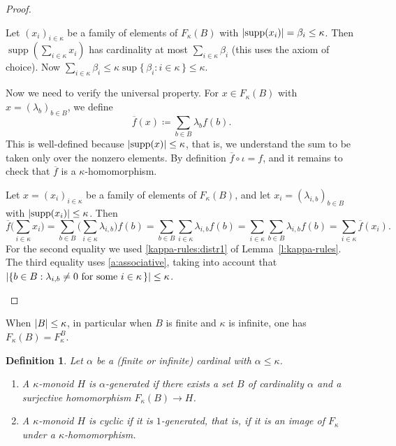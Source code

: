 \documentclass[a4paper,11pt,oneside]{amsart}
\newtheorem{defi}[teor]{Definition}
\theoremstyle{remark}
\DeclareMathOperator{\supp}{supp}
\DeclarePairedDelimiter{\card}{\lvert}{\rvert}
\newcommand{\defit}[1]{\textsf{#1}}
\begin{document}
\begin{proof}
  \begin{proofenumerate}
  \item[\ref{free:submonoid}]
  Let $(x_i)_{i \in \kappa}$ be a family of elements of $F_\kappa(B)$ with $\card{\supp(x_i)}=\beta_i \le \kappa$.
  Then $\supp(\sum_{i \in \kappa} x_i)$ has cardinality at most $\sum_{i \in \kappa} \beta_i$ (this uses the axiom of choice).
  Now $\sum_{i \in \kappa} \beta_i \le \kappa \sup\{\, \beta_i : i \in \kappa \,\} \le \kappa$.

  \item[\ref{free:up}]
  Now we need to verify the universal property.
  For $x \in F_{\kappa}(B)$ with $x = (\lambda_b)_{b \in B}$, we define
  \[
    \overline f(x) \coloneqq \sum_{b \in B} \lambda_b f(b).
  \]
  This is well-defined because $\card{\supp(x)} \le \kappa$, that is, we understand the sum to be taken only over the nonzero elements.
  By definition $\overline f \circ \iota = f$, and it remains to check that $\overline f$ is a $\kappa$-homomorphism.
  
  Let $x=(x_i)_{i \in \kappa}$ be a family of elements of $F_\kappa(B)$, and let $x_i = (\lambda_{i,b})_{b \in B}$ with $\card{\supp(x_i)} \le \kappa$.
  Then
  \[
    \overline f \Big( \sum_{i \in \kappa} x_i\Big) = \sum_{b \in B} \Big( \sum_{i \in \kappa} \lambda_{i,b} \Big) f(b) = \sum_{b \in B} \sum_{i \in \kappa} \lambda_{i,b} f(b)  = \sum_{i \in \kappa} \sum_{b \in B} \lambda_{i,b} f(b) = \sum_{i \in \kappa} \overline f(x_i).
  \]
  For the second equality we used \ref{kappa-rules:distr1} of Lemma~\ref{l:kappa-rules}.
  The third equality uses \ref{a:associative}, taking into account that $\card{ \{ b \in B : \lambda_{i,b} \ne 0 \text{ for some } i \in \kappa \,\} } \le \kappa$. \qedhere
  \end{proofenumerate}
\end{proof}

When $\card{B} \le \kappa$, in particular when $B$ is finite and $\kappa$ is infinite, one has $F_\kappa(B) = F_\kappa^{B}$.

\begin{defi}
  Let $\alpha$ be a \textup(finite or infinite\textup) cardinal with $\alpha \le \kappa$.
  \begin{enumerate}
  \item A $\kappa$-monoid $H$ is \defit{$\alpha$-generated} if there exists a set $B$ of cardinality $\alpha$ and a surjective homomorphism $F_\kappa(B) \to H$.
  \item A $\kappa$-monoid $H$ is \defit{cyclic} if it is $1$-generated, that is, if it is an image of $F_\kappa$ under a $\kappa$-homomorphism.
  \end{enumerate}

\end{defi}
\end{document}

